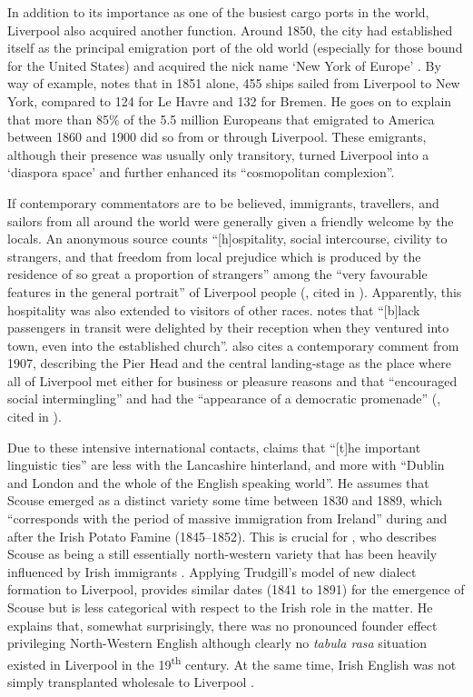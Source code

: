 In addition to its importance as one of the busiest cargo ports in the world, Liverpool also acquired another function.
Around 1850, the city had established itself as the principal emigration port of the old world (especially for those bound for the United States) and acquired the nick name `New York of Europe' \parencite[xxvii]{belchem2006c}.
By way of example, \citet[14]{belchem2006a} notes that in 1851 alone, 455 ships sailed from Liverpool to New York, compared to 124 for Le Havre and 132 for Bremen.
He goes on to explain that more than 85\% of the 5.5 million Europeans that emigrated to America between 1860 and 1900 did so from or through Liverpool.
These emigrants, although their presence was usually only transitory, turned Liverpool into a `diaspora space' and further enhanced its ``cosmopolitan complexion''.

If contemporary commentators are to be believed, immigrants, travellers, and sailors from all around the world were generally given a friendly welcome by the locals.
An anonymous source counts ``[h]ospitality, social intercourse, civility to strangers, and that freedom from local prejudice which is produced by the residence of so great a proportion of strangers'' among the ``very favourable features in the general portrait'' of Liverpool people (\citealt{anon1812}, cited in \citealt[12]{crowley2012}).
Apparently, this hospitality was also extended to visitors of other races.
\citet[13]{belchem2006a} notes that ``[b]lack passengers in transit were delighted by their reception when they ventured into town, even into the established church''.
\citeauthor{belchem2006d} also cites a contemporary comment from 1907, describing the Pier Head and the central landing-stage as the place where all of Liverpool met either for business or pleasure reasons and that ``encouraged social intermingling'' and had the ``appearance of a democratic promenade'' (\citealt{scott1907}, cited in \citealt[45]{belchem2006d}).

Due to these intensive international contacts, \citet[15]{knowles1973} claims that ``[t]he important linguistic ties'' are less with the Lancashire hinterland, and more with ``Dublin and London and the whole of the English speaking world''.
He assumes that Scouse emerged as a distinct variety some time between 1830 and 1889, which ``corresponds with the period of massive immigration from Ireland'' \citeyearpar[18]{knowles1973} during and after the Irish Potato Famine (1845--1852).
This is crucial for \citeauthor{knowles1973}, who describes Scouse as being a still essentially north-western variety that has been heavily influenced by Irish immigrants \citeyearpar[cf.][51]{knowles1973}.
Applying Trudgill's model of new dialect formation \citep{trudgill1986,trudgill2004} to Liverpool, \citeauthor{honeybone2007} provides similar dates (1841 to 1891) for the emergence of Scouse but is less categorical with respect to the Irish role in the matter.
He explains that, somewhat surprisingly, there was no pronounced founder effect privileging North-Western English although clearly no \emph{tabula rasa} situation existed in Liverpool in the 19\textsuperscript{th} century.
At the same time, Irish English was not simply transplanted wholesale to Liverpool \citep[cf.][117 and 121]{honeybone2007}.

